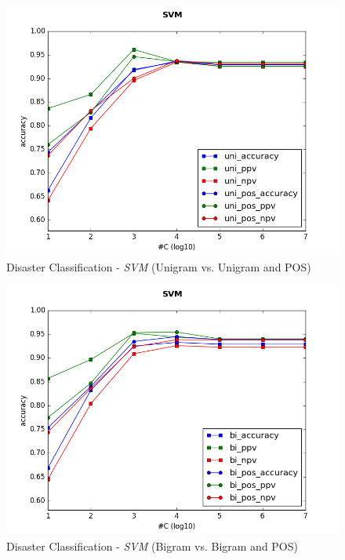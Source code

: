 \documentclass[letterpaper,twocolumn,10pt]{article}
\begin{document}
\begin{figure}[H]
	\centering
	\includegraphics[trim={0 0 0 1cm},clip,width=\columnwidth]{../graphs/DisasterClassification/svm_uni_features.png}
	\caption{Disaster Classification - \textit{SVM} (Unigram vs. Unigram and POS)}
	\label{fig:disaster_classification_svm_uni}
\end{figure}

\begin{figure}[H]
	\centering
	\includegraphics[trim={0 0 0 1cm},clip,width=\columnwidth]{../graphs/DisasterClassification/svm_bi_features.png}
	\caption{Disaster Classification - \textit{SVM} (Bigram vs. Bigram and POS)}
	\label{fig:disaster_classification_svm_bi}
\end{figure}
\end{document}
